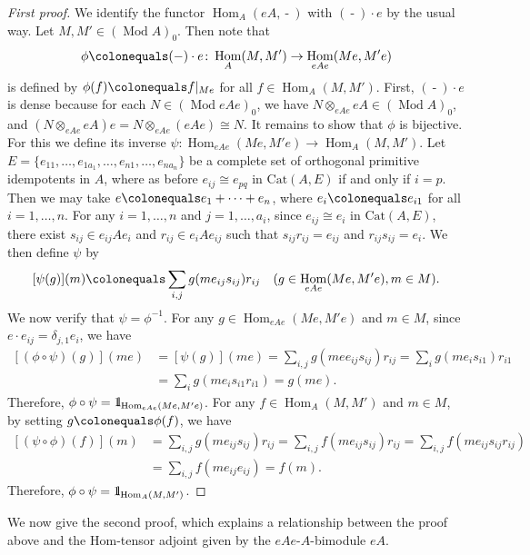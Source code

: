 \documentclass{surv-l}
\numberwithin{equation}{chapter}
\numberwithin{figure}{chapter}
\theoremstyle{plain}
\theoremstyle{definition}
\theoremstyle{remark}
\newcommand{\id}{1\kern-.25em{\text{{\rm l}}}}
\DeclareMathOperator{\Hom}{Hom}
\DeclareMathOperator{\Mod}{Mod}
\DeclareMathOperator{\blank}{-}
\begin{document}
\begin{proof}[First proof]
We identify the functor $\Hom_A(eA, \blank)$ with $(\blank)\cdot e$
by the usual way.
Let $M, M' \in (\Mod A)_0$.
Then note that
\[
\phi\colonequals  (\blank)\cdot e \colon \Hom_A(M, M') \to \Hom_{eAe}(Me, M'e)
\]
is defined by $\phi(f)\colonequals  f|_{Me}$ for all $f \in \Hom_A(M, M')$.
First, $(\blank)\cdot e$ is dense because for each $N \in (\Mod eAe)_0$,
we have
$N \otimes_{eAe}eA \in (\Mod A)_0$, and $(N \otimes_{eAe} eA) e = N \otimes_{eAe} (eAe) \cong N$.
It remains to show that $\phi$ is bijective.
For this we define its inverse $\psi \colon \Hom_{eAe}(Me, M'e) \to \Hom_A(M, M')$.
Let $E \!=\! \{e_{11}, \dots, e_{1a_1}, \dots, e_{n1}, \dots, e_{na_n}\}$
be a complete set of orthogonal primitive idempotents in $A$,
where as before $e_{ij} \cong e_{pq}$ in $\mathrm{Cat}(A, E)$ if and only if $i=p$.
Then we may take $e\colonequals  e_1+\cdots + e_n$, where $e_i\colonequals  e_{i1}$ for all $i = 1, \dots, n$.
For any $i = 1, \dots, n$ and $j = 1, \dots, a_i$,
since $e_{ij} \cong e_i$ in $\mathrm{Cat}(A, E)$,
there exist $s_{ij} \in e_{ij}Ae_i$ and $r_{ij} \in e_iAe_{ij}$ such that
$s_{ij}r_{ij} = e_{ij}$ and $r_{ij}s_{ij} = e_i$.
We then define $\psi$ by
\[
[\psi(g)](m)\colonequals  \sum_{i,j}g(me_{ij} s_{ij}) r_{ij} \quad (g \in \Hom_{eAe}(Me, M'e), m \in M).
\]
We now verify that $\psi = \phi^{-1}$.
For any $g \in \Hom_{eAe}(Me, M'e)$ and $m \in M$, since $e\cdot e_{ij} = \delta_{j,1} e_i$, we have
\[
\begin{aligned}
{[(\phi\circ \psi)(g)]}(me) &= [\psi(g)](me) = \sum_{i,j}g(mee_{ij} s_{ij}) r_{ij}
= \sum_{i}g(me_{i} s_{i1}) r_{i1}\\
&= \sum_i g(me_{i} s_{i1}r_{i1}) = g(me).
\end{aligned}
\]
Therefore,
$\phi \circ \psi = \id_{\Hom_{eAe}(Me, M'e)}$.
For any $f \in \Hom_A(M, M')$ and $m \in M$, by setting $g\colonequals  \phi(f)$, we have
\[
\begin{aligned}
{[(\psi\circ \phi)(f)]}(m) &= \sum_{i,j}g(me_{ij} s_{ij}) r_{ij} = \sum_{i,j} f(me_{ij} s_{ij}) r_{ij}
= \sum_{i,j} f(me_{ij} s_{ij}r_{ij})\\
&= \sum_{i,j} f(me_{ij} e_{ij}) = f(m).
\end{aligned}
\]
Therefore,
$\phi \circ \psi = \id_{\Hom_A(M,M')}$.
\end{proof}

We now give the second proof, which explains a relationship between the proof above and
the Hom-tensor adjoint given by the $eAe$-$A$-bimodule $eA$.
\end{document}
